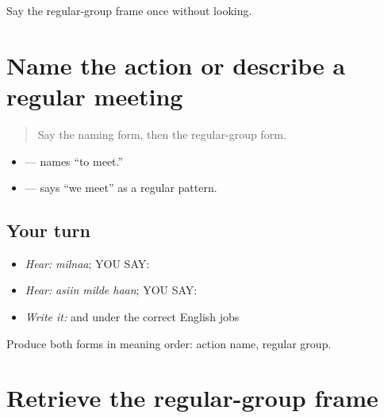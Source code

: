 \begin{tcolorbox}[breakable,colback=teal!4,colframe=teal!35!black,title={Before you move on}]
Say the regular-group frame once without looking.
\end{tcolorbox}
\section[\texorpdfstring{\pa{ਮਿਲਣਾ} · \pa{ਅਸੀਂ} \pa{ਮਿਲਦੇ} … (milnaa; asiin …)}{ਮਿਲਣਾ · ਅਸੀਂ ਮਿਲਦੇ … (milnaa; asiin …)}]{Name the action or describe a regular meeting}

\label{lesson:PA-C188-milna-milde-contrast}



\begin{quote}
Say the naming form, then the regular-group form.
\end{quote}

\begin{grammarlens}[title={Grammar Lens: two jobs}]
\begin{itemize}
\raggedright
  \item \textbf{} — names “to meet.”
  \item \textbf{  } — says “we meet” as a regular pattern.
\end{itemize}
\end{grammarlens}

\subsection*{Your turn}
\begin{itemize}
\raggedright
  \item \emph{Hear:} \emph{milnaa}; YOU SAY: \textbf{}
  \item \emph{Hear:} \emph{asiin milde haan}; YOU SAY: \textbf{  }
  \item \emph{Write it:} \textbf{} and \textbf{} under the correct English jobs
\end{itemize}

\begin{tcolorbox}[breakable,colback=teal!4,colframe=teal!35!black,title={Before you move on}]
Produce both forms in meaning order: action name, regular group.
\end{tcolorbox}
\section[\texorpdfstring{\pa{ਅਸੀਂ} \pa{ਮਿਲਦੇ} \pa{ਹਾਂ} (asiin milde haan)}{ਅਸੀਂ ਮਿਲਦੇ ਹਾਂ (asiin milde haan)}]{Retrieve the regular-group frame}

